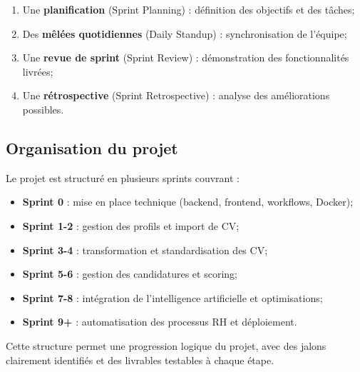 \begin{enumerate}
    \item Une \textbf{planification} (Sprint Planning) : définition des objectifs et des tâches;
    
    \item Des \textbf{mêlées quotidiennes} (Daily Standup) : synchronisation de l'équipe;
    
    \item Une \textbf{revue de sprint} (Sprint Review) : démonstration des fonctionnalités livrées;
    
    \item Une \textbf{rétrospective} (Sprint Retrospective) : analyse des améliorations possibles.
\end{enumerate}


\subsection{Organisation du projet}
\label{subsec:organisation-projet}

Le projet est structuré en plusieurs sprints couvrant :

\begin{itemize}
    \item \textbf{Sprint 0} : mise en place technique (backend, frontend, workflows, Docker);
    
    \item \textbf{Sprint 1-2} : gestion des profils et import de CV;
    
    \item \textbf{Sprint 3-4} : transformation et standardisation des CV;
    
    \item \textbf{Sprint 5-6} : gestion des candidatures et scoring;
    
    \item \textbf{Sprint 7-8} : intégration de l'intelligence artificielle et optimisations;
    
    \item \textbf{Sprint 9+} : automatisation des processus RH et déploiement.
\end{itemize}

Cette structure permet une progression logique du projet, avec des jalons clairement identifiés et des livrables testables à chaque étape.

\newpage
